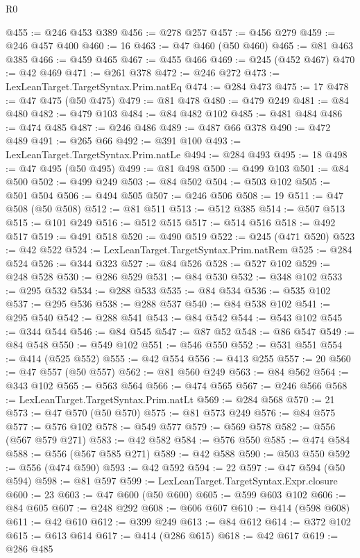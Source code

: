 \begin{lexlean}{R0}
\begin{coremodule}
@455 := @246 @453 @389
@456 := @278 @257
@457 := @456 @279
@459 := @246 @457 @400
@460 := 16
@463 := @47 @460 (@50 @460)
@465 := @81 @463 @385
@466 := @459 @465
@467 := @455 @466
@469 := @245 (@452 @467)
@470 := @42 @469
@471 := @261 @378
@472 := @246 @272
@473 := LexLeanTarget.TargetSyntax.Prim.natEq
@474 := @284 @473
@475 := 17
@478 := @47 @475 (@50 @475)
@479 := @81 @478
@480 := @479 @249
@481 := @84 @480
@482 := @479 @103
@484 := @84 @482 @102
@485 := @481 @484
@486 := @474 @485
@487 := @246 @486
@489 := @487 @66 @378
@490 := @472 @489
@491 := @265 @66
@492 := @391 @100
@493 := LexLeanTarget.TargetSyntax.Prim.natLe
@494 := @284 @493
@495 := 18
@498 := @47 @495 (@50 @495)
@499 := @81 @498
@500 := @499 @103
@501 := @84 @500
@502 := @499 @249
@503 := @84 @502
@504 := @503 @102
@505 := @501 @504
@506 := @494 @505
@507 := @246 @506
@508 := 19
@511 := @47 @508 (@50 @508)
@512 := @81 @511
@513 := @512 @385
@514 := @507 @513
@515 := @101 @249
@516 := @512 @515
@517 := @514 @516
@518 := @492 @517
@519 := @491 @518
@520 := @490 @519
@522 := @245 (@471 @520)
@523 := @42 @522
@524 := LexLeanTarget.TargetSyntax.Prim.natRem
@525 := @284 @524
@526 := @344 @323
@527 := @84 @526
@528 := @527 @102
@529 := @248 @528
@530 := @286 @529
@531 := @84 @530
@532 := @348 @102
@533 := @295 @532
@534 := @288 @533
@535 := @84 @534
@536 := @535 @102
@537 := @295 @536
@538 := @288 @537
@540 := @84 @538 @102
@541 := @295 @540
@542 := @288 @541
@543 := @84 @542
@544 := @543 @102
@545 := @344 @544
@546 := @84 @545
@547 := @87 @52
@548 := @86 @547
@549 := @84 @548
@550 := @549 @102
@551 := @546 @550
@552 := @531 @551
@554 := @414 (@525 @552)
@555 := @42 @554
@556 := @413 @255
@557 := 20
@560 := @47 @557 (@50 @557)
@562 := @81 @560 @249
@563 := @84 @562
@564 := @343 @102
@565 := @563 @564
@566 := @474 @565
@567 := @246 @566
@568 := LexLeanTarget.TargetSyntax.Prim.natLt
@569 := @284 @568
@570 := 21
@573 := @47 @570 (@50 @570)
@575 := @81 @573 @249
@576 := @84 @575
@577 := @576 @102
@578 := @549 @577
@579 := @569 @578
@582 := @556 (@567 @579 @271)
@583 := @42 @582
@584 := @576 @550
@585 := @474 @584
@588 := @556 (@567 @585 @271)
@589 := @42 @588
@590 := @503 @550
@592 := @556 (@474 @590)
@593 := @42 @592
@594 := 22
@597 := @47 @594 (@50 @594)
@598 := @81 @597
@599 := LexLeanTarget.TargetSyntax.Expr.closure
@600 := 23
@603 := @47 @600 (@50 @600)
@605 := @599 @603 @102
@606 := @84 @605
@607 := @248 @292
@608 := @606 @607
@610 := @414 (@598 @608)
@611 := @42 @610
@612 := @399 @249
@613 := @84 @612
@614 := @372 @102
@615 := @613 @614
@617 := @414 (@286 @615)
@618 := @42 @617
@619 := @286 @485

\end{coremodule}
\end{lexlean}
